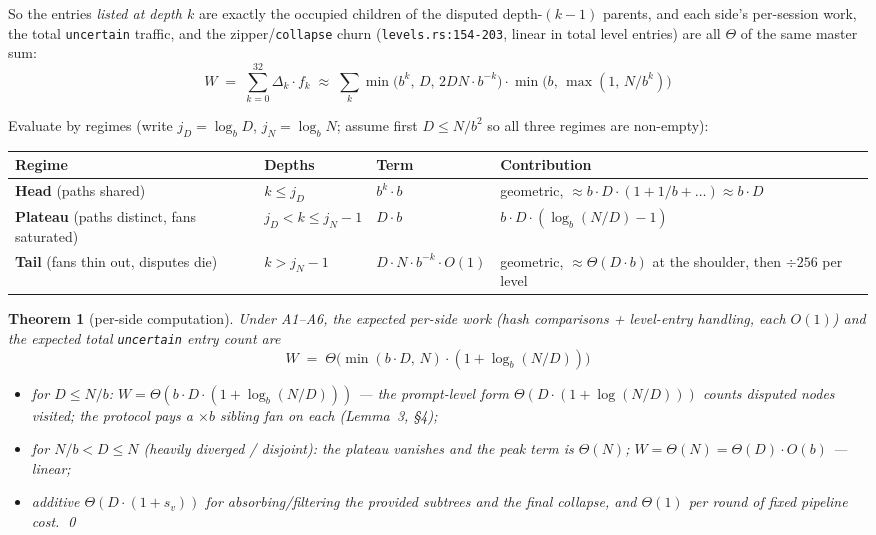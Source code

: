 \documentclass[11pt]{article}
\newcommand{\code}[1]{\texttt{#1}}
\theoremstyle{plain}
\newtheorem{theorem}{Theorem}
\begin{document}
So the entries \emph{listed at depth $k$} are exactly the occupied children
of the disputed depth-$(k-1)$ parents, and each side's per-session work,
the total \code{uncertain} traffic, and the zipper/\code{collapse} churn
(\code{levels.rs:154-203}, linear in total level entries) are all $\Theta$
of the same master sum:
\begin{equation*}
W \;=\; \sum_{k=0}^{32} \Delta_k \cdot f_k
\;\approx\; \sum_k \min\bigl(b^k,\, D,\, 2DN \cdot b^{-k}\bigr)
            \cdot \min\bigl(b,\, \max(1,\, N/b^k)\bigr)
\end{equation*}

Evaluate by regimes (write $j_D = \log_b D$, $j_N = \log_b N$; assume first
$D \le N/b^2$ so all three regimes are non-empty):

\begin{center}
\begin{tabular}{@{}L{0.30\textwidth}lL{0.13\textwidth}L{0.26\textwidth}@{}}
\toprule
Regime & Depths & Term & Contribution \\
\midrule
\textbf{Head} (paths shared) & $k \le j_D$ & $b^k \cdot b$ &
  geometric, $\approx b \cdot D \cdot (1 + 1/b + \dots) \approx b \cdot D$ \\
\addlinespace
\textbf{Plateau} (paths distinct, fans saturated) & $j_D < k \le j_N - 1$ &
  $D \cdot b$ & $b \cdot D \cdot (\log_b(N/D) - 1)$ \\
\addlinespace
\textbf{Tail} (fans thin out, disputes die) & $k > j_N - 1$ &
  $D \cdot N \cdot b^{-k} \cdot O(1)$ &
  geometric, $\approx \Theta(D \cdot b)$ at the shoulder, then $\div 256$
  per level \\
\bottomrule
\end{tabular}
\end{center}

\begin{theorem}[per-side computation]
Under A1--A6, the expected per-side work (hash comparisons + level-entry
handling, each $O(1)$) and the expected total \code{uncertain} entry count
are
\begin{equation*}
W \;=\; \Theta\bigl( \min(b \cdot D,\, N) \cdot (1 + \log_b(N/D)) \bigr)
\end{equation*}
\begin{itemize}
\item for $D \le N/b$: $W = \Theta(b \cdot D \cdot (1 + \log_b(N/D)))$ ---
  the prompt-level form $\Theta(D \cdot (1 + \log(N/D)))$ counts
  \emph{disputed nodes visited}; the protocol pays a $\times b$ sibling fan
  on each (Lemma~3, \S4);
\item for $N/b < D \le N$ (heavily diverged / disjoint): the plateau
  vanishes and the peak term is $\Theta(N)$;
  $W = \Theta(N) = \Theta(D) \cdot O(b)$ --- linear;
\item additive $\Theta(D \cdot (1 + s_v))$ for absorbing/filtering the
  provided subtrees and the final collapse, and $\Theta(1)$ per round of
  fixed pipeline cost. \qed
\end{itemize}
\end{theorem}
\end{document}
